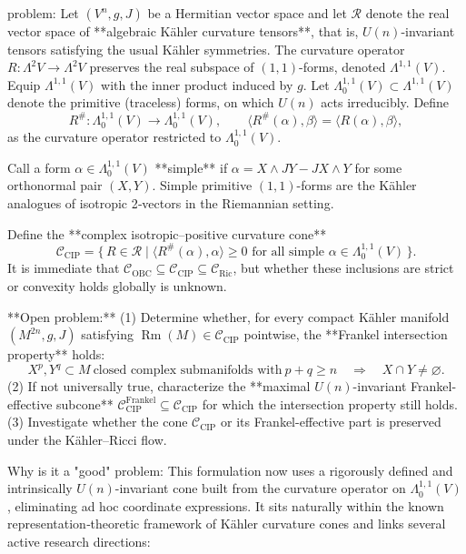 problem:  
Let \((V^{n}, g, J)\) be a Hermitian vector space and let \(\mathcal{R}\) denote the real vector space of **algebraic Kähler curvature tensors**, that is, \(U(n)\)-invariant tensors satisfying the usual Kähler symmetries.  The curvature operator \(R:\Lambda^{2}V\to \Lambda^{2}V\) preserves the real subspace of \((1,1)\)-forms, denoted \(\Lambda^{1,1}(V)\).  Equip \(\Lambda^{1,1}(V)\) with the inner product induced by \(g\).  Let \(\Lambda^{1,1}_0(V)\subset \Lambda^{1,1}(V)\) denote the primitive (traceless) forms, on which \(U(n)\) acts irreducibly.  Define  
\[
R^{\#}:\Lambda^{1,1}_0(V)\longrightarrow \Lambda^{1,1}_0(V), \qquad
\langle R^{\#}(\alpha),\beta\rangle = \langle R(\alpha),\beta\rangle,
\]
as the curvature operator restricted to \(\Lambda^{1,1}_0(V)\).

Call a form \(\alpha\in\Lambda^{1,1}_0(V)\) **simple** if \(\alpha=X\wedge JY-JX\wedge Y\) for some orthonormal pair \((X,Y)\).  Simple primitive \((1,1)\)-forms are the Kähler analogues of isotropic 2‑vectors in the Riemannian setting.

Define the **complex isotropic–positive curvature cone**  
\[
\mathcal{C}_{\text{CIP}}
   =\{\,R\in\mathcal{R}\mid 
       \langle R^{\#}(\alpha),\alpha\rangle\ge0 
       \text{ for all simple }\alpha\in\Lambda^{1,1}_0(V)\,\}.
\]
It is immediate that \(\mathcal{C}_{\text{OBC}}\subseteq \mathcal{C}_{\text{CIP}}\subseteq \mathcal{C}_{\text{Ric}}\), but whether these inclusions are strict or convexity holds globally is unknown.

**Open problem:**  
(1)  Determine whether, for every compact Kähler manifold \((M^{2n},g,J)\) satisfying \(\operatorname{Rm}(M)\in\mathcal{C}_{\text{CIP}}\) pointwise, the **Frankel intersection property** holds:
\[
X^p, Y^q\subset M\ \text{closed complex submanifolds with}\ p+q\ge n
\quad\Rightarrow\quad
X\cap Y\neq\varnothing.
\]
(2)  If not universally true, characterize the **maximal \(U(n)\)-invariant Frankel-effective subcone**
\(\mathcal{C}_{\text{CIP}}^{\text{Frankel}}\subseteq\mathcal{C}_{\text{CIP}}\)
for which the intersection property still holds.  
(3)  Investigate whether the cone \(\mathcal{C}_{\text{CIP}}\) or its Frankel-effective part is preserved under the Kähler–Ricci flow.

Why is it a "good" problem:  
This formulation now uses a rigorously defined and intrinsically \(U(n)\)-invariant cone built from the curvature operator on \(\Lambda^{1,1}_0(V)\), eliminating ad hoc coordinate expressions.  It sits naturally within the known representation‑theoretic framework of Kähler curvature cones and links several active research directions:

